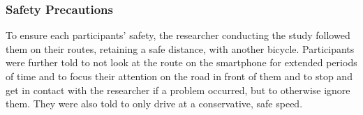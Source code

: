 \subsubsection*{Safety Precautions}

To ensure each participants' safety, the researcher conducting the study followed them on their routes, retaining a safe distance, with another bicycle.
Participants were further told to not look at the route on the smartphone for extended periods of time and to focus their attention on the road in front of them and to stop and get in contact with the researcher if a problem occurred, but to otherwise ignore them.
They were also told to only drive at a conservative, safe speed.
